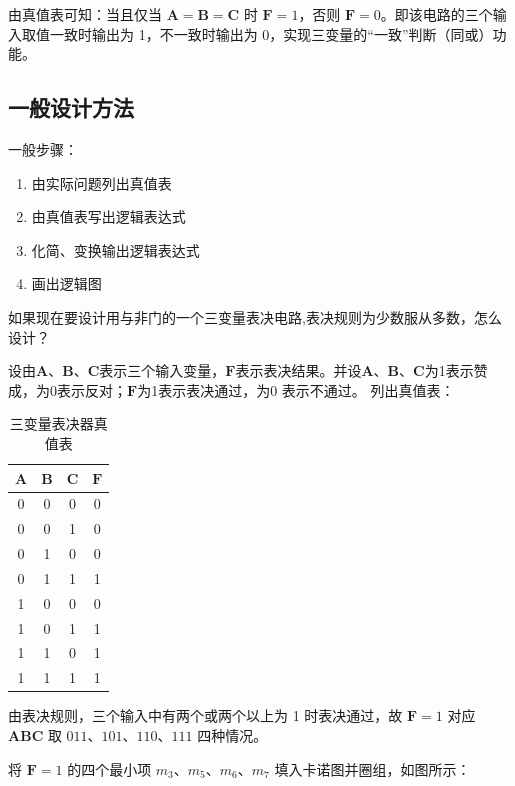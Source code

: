 由真值表可知：当且仅当 $\mathbf{A}=\mathbf{B}=\mathbf{C}$ 时 $\mathbf{F}=1$，否则 $\mathbf{F}=0$。即该电路的三个输入取值一致时输出为 1，不一致时输出为 0，实现三变量的“一致”判断（同或）功能。

\subsection{一般设计方法}
一般步骤：
\begin{enumerate}
    \item 由实际问题列出真值表
    \item 由真值表写出逻辑表达式
    \item 化简、变换输出逻辑表达式
    \item 画出逻辑图
\end{enumerate}
如果现在要设计用与非门的一个三变量表决电路,表决规则为少数服从多数，怎么设计？

设由$\mathbf{A} $、$\mathbf{B}$、$\mathbf{C} $表示三个输入变量，$\mathbf{F}$表示表决结果。并设$\mathbf{A} $、$\mathbf{B}$、$\mathbf{C}$为1表示赞成，为0表示反对；$\mathbf{F}$为1表示表决通过，为0 表示不通过。
列出真值表：

\begin{table}[H]
	\centering
	\caption{三变量表决器真值表}
	\label{tab:真值表:表决器}
	\begin{tabular}{ccc|c}
		\toprule
		$\mathbf{A}$ & $\mathbf{B}$ & $\mathbf{C}$ & $\mathbf{F}$ \\
		\midrule
		0 & 0 & 0 & 0 \\
		0 & 0 & 1 & 0 \\
		0 & 1 & 0 & 0 \\
		0 & 1 & 1 & 1 \\
		1 & 0 & 0 & 0 \\
		1 & 0 & 1 & 1 \\
		1 & 1 & 0 & 1 \\
		1 & 1 & 1 & 1 \\
		\bottomrule
	\end{tabular}
\end{table}

由表决规则，三个输入中有两个或两个以上为 1 时表决通过，故 $\mathbf{F}=1$ 对应 $\mathbf{A}\mathbf{B}\mathbf{C}$ 取 $011$、$101$、$110$、$111$ 四种情况。

将 $\mathbf{F}=1$ 的四个最小项 $m_3$、$m_5$、$m_6$、$m_7$ 填入卡诺图并圈组，如图所示：


